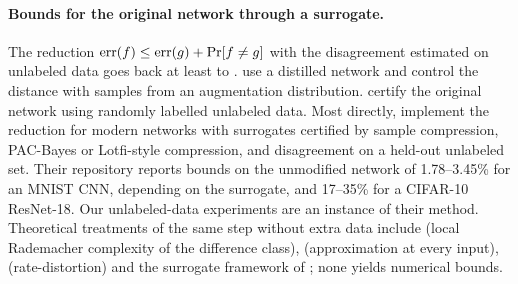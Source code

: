 \paragraph{Bounds for the original network through a surrogate.} The reduction $\mathrm{err}(f)\le\mathrm{err}(g)+\Pr[f\ne g]$ with the disagreement estimated on unlabeled data goes back at least to \citet{kaariainen2005generalization}. \citet{hsu2021generalization} use a distilled network and control the distance with samples from an augmentation distribution. \citet{garg2021ratt} certify the original network using randomly labelled unlabeled data. Most directly, \citet{bazinet2026bound} implement the reduction for modern networks with surrogates certified by sample compression, PAC-Bayes or Lotfi-style compression, and disagreement on a held-out unlabeled set. Their repository reports bounds on the unmodified network of 1.78--3.45\% for an MNIST CNN, depending on the surrogate, and 17--35\% for a CIFAR-10 ResNet-18. Our unlabeled-data experiments are an instance of their method. Theoretical treatments of the same step without extra data include \citet{suzuki2020compression} (local Rademacher complexity of the difference class), \citet{daniely2019generalization} (approximation at every input), \citet{sefidgaran2022rate} (rate-distortion) and the surrogate framework of \citet{negrea2020defense}; none yields numerical bounds.


